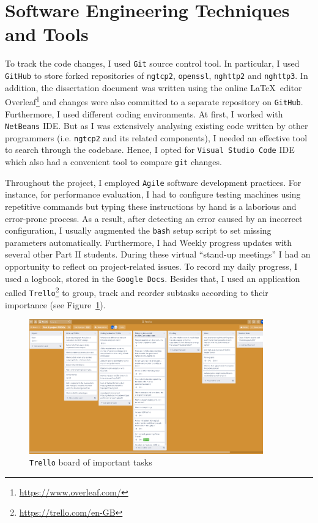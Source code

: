 \documentclass[12pt,a4paper,twoside,openright]{report}
\begin{document}
\section{Software Engineering Techniques and Tools}
    To track the code changes, I used \texttt{Git} source control tool.
    In particular, I used \texttt{GitHub} to store forked repositories of \texttt{ngtcp2}, \texttt{openssl}, \texttt{nghttp2} and \texttt{nghttp3}.
    In addition, the dissertation document was written using the online \LaTeX\  editor Overleaf\footnote{\url{https://www.overleaf.com/}} and changes were also committed to a separate repository on \texttt{GitHub}.
    Furthermore, I used different coding environments.
    At first, I worked with \texttt{NetBeans} IDE.
    But as I was extensively analysing existing code written by other programmers (i.e. \texttt{ngtcp2} and its related components), I needed an effective tool to search through the codebase.
    Hence, I opted for \texttt{Visual Studio Code} IDE which also had a convenient tool to compare \texttt{git} changes.
    
    
    Throughout the project, I employed \texttt{Agile} software development practices.
    For instance, for performance evaluation, I had to configure testing machines using repetitive commands but typing these instructions by hand is a laborious and error-prone process.
    As a result, after detecting an error caused by an incorrect configuration, I usually augmented the \texttt{bash} setup script to set missing parameters automatically.
    Furthermore, I had Weekly progress updates with several other Part II students.
    During these virtual \enquote{stand-up meetings} I had an opportunity to reflect on project-related issues.
    To record my daily progress, I used a logbook, stored in the \texttt{Google Docs}.
    Besides that, I used an application called \texttt{Trello}\footnote{\url{https://trello.com/en-GB}} to group, track and reorder subtasks according to their importance (see Figure~\ref{fig:Trello_board}).

    \begin{figure}[ht]
    \centering
    \includegraphics[width=0.9\textwidth]{figs/Trello_board.PNG}
    \caption{\texttt{Trello} board of important tasks}
    \label{fig:Trello_board}
    \end{figure}
    
\end{document}
